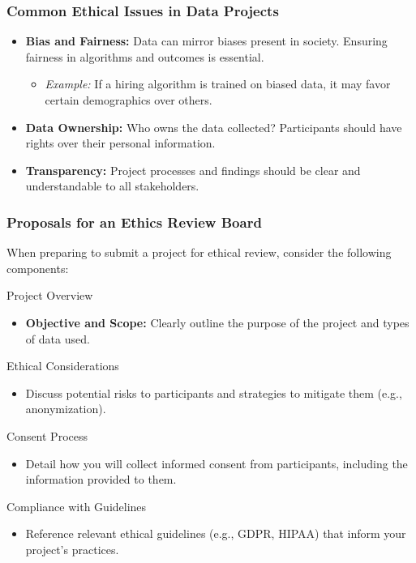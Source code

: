 \documentclass{beamer}
\begin{document}
\begin{frame}[fragile]
    \frametitle{Common Ethical Issues in Data Projects}
    
    \begin{itemize}
        \item \textbf{Bias and Fairness:} Data can mirror biases present in society. Ensuring fairness in algorithms and outcomes is essential.
        \begin{itemize}
            \item \textit{Example:} If a hiring algorithm is trained on biased data, it may favor certain demographics over others.
        \end{itemize}
        \item \textbf{Data Ownership:} Who owns the data collected? Participants should have rights over their personal information.
        \item \textbf{Transparency:} Project processes and findings should be clear and understandable to all stakeholders.
    \end{itemize}
\end{frame}

\begin{frame}[fragile]
    \frametitle{Proposals for an Ethics Review Board}
    
    When preparing to submit a project for ethical review, consider the following components:

    \begin{block}{Project Overview}
        \begin{itemize}
            \item \textbf{Objective and Scope:} Clearly outline the purpose of the project and types of data used.
        \end{itemize}
    \end{block}

    \begin{block}{Ethical Considerations}
        \begin{itemize}
            \item Discuss potential risks to participants and strategies to mitigate them (e.g., anonymization).
        \end{itemize}
    \end{block}
    
    \begin{block}{Consent Process}
        \begin{itemize}
            \item Detail how you will collect informed consent from participants, including the information provided to them.
        \end{itemize}
    \end{block}

    \begin{block}{Compliance with Guidelines}
        \begin{itemize}
            \item Reference relevant ethical guidelines (e.g., GDPR, HIPAA) that inform your project's practices.
        \end{itemize}
    \end{block}
\end{frame}
\end{document}
